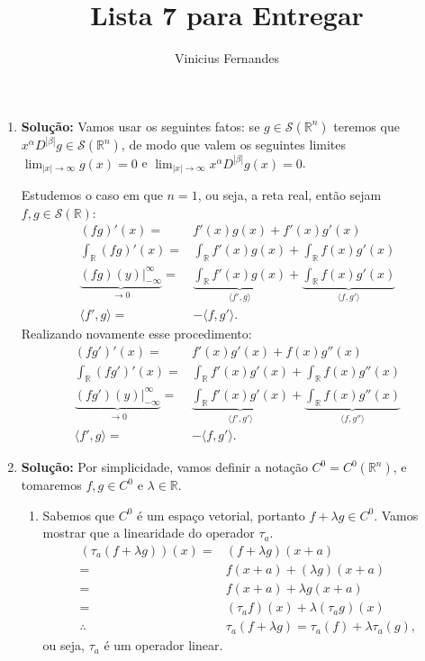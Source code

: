 \documentclass{article}
\begin{document}
	
	\title{Lista 7 para Entregar}
	\author{Vinicius Fernandes}
	
	\maketitle
	
	\begin{enumerate}
		
		\item \textbf{Solução:} Vamos usar os seguintes fatos: se $g \in \mathcal{S}(\mathbb{R}^{n})$ teremos que $x^{\alpha} D^{|\beta|}g \in \mathcal{S}(\mathbb{R}^{n})$, de modo que valem os seguintes limites $\lim_{|x| \to \infty} g(x) = 0$ e $\lim_{|x| \to \infty} x^{\alpha} D^{|\beta|}g(x) = 0$.
		
		Estudemos o caso em que $n = 1$, ou seja, a reta real, então sejam $f, g \in \mathcal{S}(\mathbb{R})$:
		$$
		\begin{aligned}
		(fg)'(x) = & f'(x)g(x) + f'(x)g'(x) 
		\\ 
		\int_{\mathbb{R}} (fg)'(x) = & \int_{\mathbb{R}} f'(x)g(x) + \int_{\mathbb{R}} f(x)g'(x) 
		\\ 
		\underbrace{ (fg)(y)\Big|^{\infty}_{-\infty} }_{\to 0} = & \underbrace{ \int_{\mathbb{R}} f'(x)g(x) }_{\langle f',g \rangle} + \underbrace{ \int_{\mathbb{R}} f(x)g'(x) }_{\langle f,g' \rangle}
		\\
		\langle f',g \rangle = & - \langle f,g' \rangle.
		\end{aligned}
		$$
		Realizando novamente esse procedimento:
		$$
		\begin{aligned}
		(fg')'(x) = & f'(x)g'(x) + f(x)g''(x) 
		\\ 
		\int_{\mathbb{R}} (fg')'(x) = & \int_{\mathbb{R}} f'(x)g'(x) + \int_{\mathbb{R}} f(x)g''(x) 
		\\ 
		\underbrace{ (fg')(y)\Big|^{\infty}_{-\infty} }_{\to 0} = & \underbrace{ \int_{\mathbb{R}} f'(x)g'(x) }_{\langle f',g' \rangle} + \underbrace{ \int_{\mathbb{R}} f(x)g''(x) }_{\langle f,g'' \rangle}
		\\
		\langle f',g \rangle = & - \langle f,g' \rangle.
		\end{aligned}
		$$
		
		\item \textbf{Solução:} Por simplicidade, vamos definir a notação $C^{0} = C^{0}(\mathbb{R}^{n})$, e tomaremos $f, g \in C^{0}$ e $\lambda \in \mathbb{R}$.
			\begin{enumerate}
				\item Sabemos que $C^{0}$ é um espaço vetorial, portanto $f + \lambda g \in C^{0}$. Vamos mostrar que a linearidade do operador $\tau_{a}$.
				$$
				\begin{aligned}
				(\tau_{a}(f+\lambda g))(x) = &  (f+\lambda g)(x+a) \\
				= & f(x+a) +(\lambda g)(x+a)
				\\
				= & f(x+a) +\lambda g(x+a)
				\\
				= & (\tau_{a}f)(x) +\lambda (\tau_{a}g)(x)
				\\
				\therefore & \tau_{a}(f+\lambda g) = \tau_{a}(f)+\lambda \tau_{a}(g),
				\end{aligned}
				$$
				ou seja, $\tau_{a}$ é um operador linear.
				

\end{enumerate}
\end{enumerate}
\end{document}

